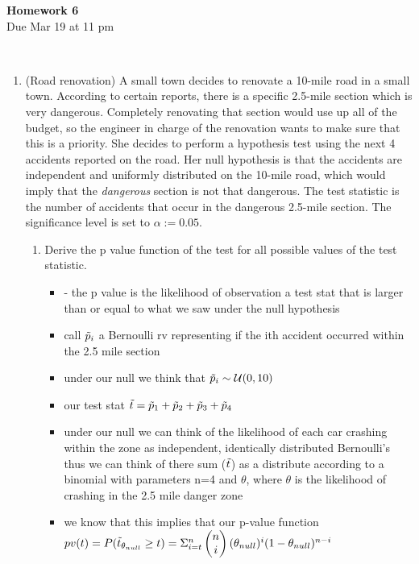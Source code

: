 \documentclass[12pt,twoside]{article}
\begin{document}
\begin{center}
{\large{\textbf{Homework 6}} } \vspace{0.2cm}\\
Due Mar 19 at 11 pm
\\
\end{center}
\\

\begin{enumerate}

\item (Road renovation) 
A small town decides to renovate a 10-mile road in a small town. According to certain reports, there is a specific 2.5-mile section which is very dangerous. Completely renovating that section would use up all of the budget, so the engineer in charge of the renovation wants to make sure that this is a priority. She decides to perform a hypothesis test using the next 4 accidents reported on the road. Her null hypothesis is that the accidents are independent and uniformly distributed on the 10-mile road, which would imply that the \emph{dangerous} section is not that dangerous. The test statistic is the number of accidents that occur in the dangerous 2.5-mile section. The significance level is set to $\alpha := 0.05$.
\begin{enumerate}
\item Derive the p value function of the test for all possible values of the test statistic. 
\begin{itemize}
    \color{blue}
    \item - the p value is the likelihood of observation a test stat that is larger than or equal to what we saw under the null hypothesis 
\item call $\Tilde{p}_i$ a Bernoulli rv representing if the ith accident occurred within the 2.5 mile section 
\item  under our null we think that $\Tilde{p}_i\sim \mathcal{U}(0,10)$ 
\item our test stat $\Tilde{t}=\Tilde{p}_1+\Tilde{p}_2+\Tilde{p}_3+\Tilde{p}_4$
\item under our null  we can think of the likelihood of each car crashing within the zone as independent, identically distributed Bernoulli's thus we can think of there sum ($\Tilde{t}$) as a distribute according to a binomial with parameters n=4 and $\theta$, where $\theta$ is the likelihood of crashing in the 2.5 mile danger zone
\item we know that this implies that our p-value function $pv(t)=P(\Tilde{t}_{\theta_{null}}\geq t)=\Sigma_{i=t}^{n}\begin{pmatrix}n\\i\end{pmatrix}(\theta_{null})^{i}(1-\theta_{null})^{n-i}$

\end{itemize}
\end{enumerate}
\end{enumerate}
\end{document}
